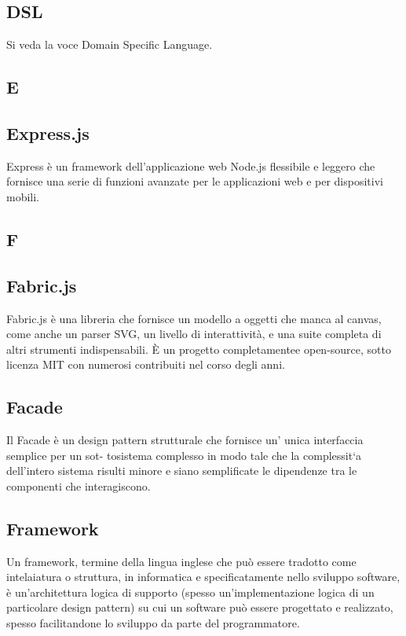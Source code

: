 \subsection{DSL}
Si veda la voce Domain Specific Language.

\newpage

\begin{center}
\Huge\section{\uppercase{E}}
\end{center}

\subsection{Express.js}
Express è un framework dell'applicazione web Node.js flessibile e leggero che fornisce una serie di funzioni avanzate per le applicazioni web e per dispositivi mobili.

\newpage

\begin{center}
\Huge\section{\uppercase{F}}
\end{center}

\subsection{Fabric.js}
Fabric.js è una libreria che fornisce un modello a oggetti che manca al canvas, come anche un parser SVG, un livello di interattività, e una suite completa di altri strumenti indispensabili. È un progetto completamentee open-source, sotto licenza MIT con numerosi contribuiti nel corso degli anni.

\subsection{Facade}
Il Facade è un design pattern strutturale che fornisce un' unica interfaccia semplice per un sot-
tosistema complesso in modo tale che la complessit`a dell'intero sistema risulti minore e siano
semplificate le dipendenze tra le componenti che interagiscono.

\subsection{Framework}
Un framework, termine della lingua inglese che può essere tradotto come intelaiatura o struttura, in informatica e specificatamente nello sviluppo software, è un'architettura logica di supporto (spesso un'implementazione logica di un particolare design pattern) su cui un software può essere progettato e realizzato, spesso facilitandone lo sviluppo da parte del programmatore.

